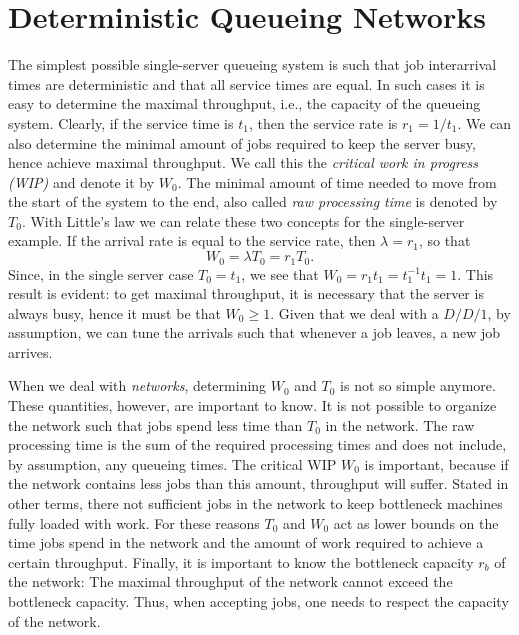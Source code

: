 
\section{Deterministic Queueing Networks}
\label{sec:determ-queu-netw}

The simplest possible single-server queueing system is such that job
interarrival times are deterministic and that all service times are
equal. In such cases it is easy to determine the maximal throughput,
i.e., the capacity of the queueing system. Clearly, if the service
time is $t_1$, then the service rate is $r_1 = 1/t_1$. We can also
determine the minimal amount of jobs required to keep the server busy,
hence achieve maximal throughput.  We call this the \emph{critical
  work in progress (WIP)} and denote it by $W_0$. The minimal amount
of time needed to move from the start of the system to the end, also
called \emph{raw processing time} is denoted by $T_0$.  With Little's
law we can relate these two concepts for the single-server example.
If the arrival rate is equal to the service rate, then
$\lambda = r_1$, so that
\begin{equation*}
  W_0 = \lambda T_0 = r_1 T_0.
\end{equation*}
Since, in the single server case $T_0 = t_1$, we see that
$W_0=r_1 t_1 = t_1^{-1}t_1 = 1$. This result is evident: to get
maximal throughput, it is necessary that the server is always busy,
hence it must be that $W_0\geq 1$. Given that we deal with a $D/D/1$,
by assumption, we can tune the arrivals such that whenever a job
leaves, a new job arrives.

When we deal with \emph{networks}, determining $W_0$ and $T_0$ is not
so simple anymore. These quantities, however, are important to
know. It is not possible to organize the network such that jobs spend
less time than $T_0$ in the network. The raw processing time is the
sum of the required processing times and does not include, by
assumption, any queueing times. The critical WIP $W_0$ is important,
because if the network contains less jobs than this amount, throughput
will suffer. Stated in other terms, there not sufficient jobs in the
network to keep bottleneck machines fully loaded with work. For these
reasons $T_0$ and $W_0$ act as lower bounds on the time jobs spend in
the network and the amount of work required to achieve a certain
throughput.  Finally, it is important to know the bottleneck capacity
$r_b$ of the network: The maximal throughput of the network cannot
exceed the bottleneck capacity. Thus, when accepting jobs, one needs
to respect the capacity of the network.

